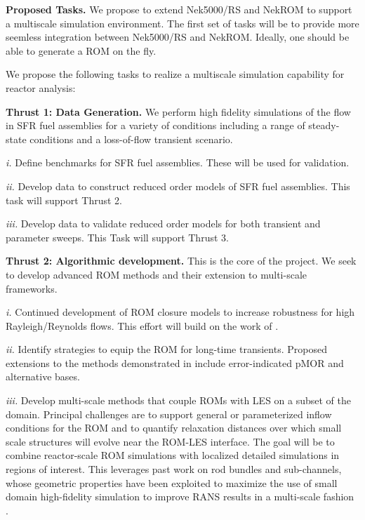 \noindent
{\bf Proposed Tasks.}
We propose to extend Nek5000/RS and NekROM to support a multiscale simulation
environment.   The first set of tasks will be to provide more seemless
integration between Nek5000/RS and NekROM.  Ideally, one should be able to
generate a ROM on the fly.

We propose the following tasks to realize a multiscale simulation
capability for reactor analysis:

\textbf{Thrust 1: Data Generation.} We perform high fidelity simulations of the
flow in SFR fuel assemblies for a variety of conditions including a range of
steady-state conditions and a loss-of-flow transient scenario.
\\[-4ex]
\begin{description}
\item{\em i.}
Define benchmarks for SFR fuel assemblies. These will be used for validation.
\\[-4ex]
\item{\em ii.}
Develop data to construct reduced order models of SFR fuel assemblies. This
task will support Thrust 2.  
\\[-4ex]
\item{\em iii.} Develop data to validate reduced order models for both
transient and parameter sweeps. This Task will support Thrust 3.
\end{description}

\textbf{Thrust 2: Algorithmic development.} This is the core of the project.
We seek to develop advanced ROM methods and their extension to multi-scale
frameworks.
\\[-4ex]
\begin{description}
\item{\em i.}
Continued development of ROM closure models to increase robustness 
for high Rayleigh/Reynolds flows.  This effort will build on the work of
\cite{kaneko22a,kaneko22,tsai22a}.
\\[-3ex]
\item{\em ii.}
Identify strategies to equip the ROM for long-time transients.  
Proposed extensions to the methods demonstrated in \cite{kaneko20a}
include error-indicated pMOR and alternative bases.
\\[-3ex]
\item{\em iii.}
Develop multi-scale methods that couple ROMs with LES on a subset of the
domain.  Principal challenges are to support general or parameterized inflow
conditions for the ROM and to quantify relaxation distances over which small
scale structures will evolve near the ROM-LES interface. The goal will be to
combine reactor-scale ROM simulations with localized detailed simulations in
regions of interest. This leverages past work on rod bundles and sub-channels,
whose geometric properties have been exploited to maximize the use of small
domain high-fidelity simulation to improve RANS results in a multi-scale
fashion \cite{martinez2019a}.  
\end{description}%

